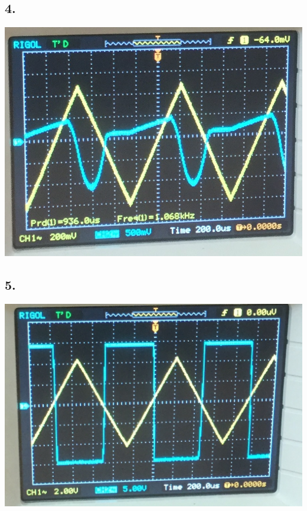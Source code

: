 \documentclass[polish,a4paper]{article}
\begin{document}
\subsection*{4.}
\includegraphics[scale=0.5]{czestotliwosc3}
\subsection*{5.}
\includegraphics[scale=0.5]{przebieg_prostokatny}
\end{document}
